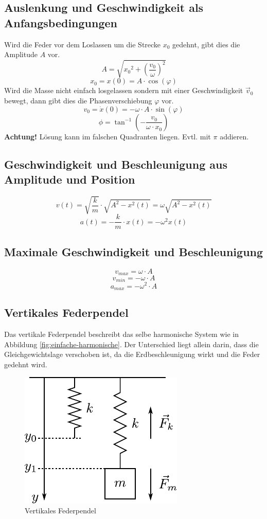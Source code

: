 \subsection{Auslenkung und Geschwindigkeit als Anfangsbedingungen}
Wird die Feder vor dem Loslassen um die Strecke $x_0$ gedehnt, gibt 
dies die Amplitude $A$ vor. 
\[ \boxed{A = \sqrt{{x_0}^2 + \left(\frac{v_0}{\omega}\right)^2}} \]
\[ \boxed{x_0 = x(0) = A \cdot \cos(\varphi)} \]
Wird die Masse nicht einfach losgelassen
sondern mit einer Geschwindigkeit $\vec{v}_0$ bewegt, dann gibt dies
die Phasenverschiebung $\varphi$ vor.
\[ \boxed{v_0 = \dot{x}(0) = - \omega \cdot A \cdot \sin(\varphi)} \]
\[ \boxed{\phi = \tan^{-1}\left(-\frac{v_0}{\omega \cdot x_0}\right)} \]
\textbf{Achtung!} Lösung kann im falschen Quadranten liegen. 
Evtl. mit $\pi$ addieren. 


\subsection{Geschwindigkeit und Beschleunigung aus Amplitude und Position}
\[ \boxed{v(t) = \sqrt{\frac{k}{m}} \cdot \sqrt{A^2 - x^2(t)}
	= \omega \sqrt{A^2 - x^2(t)}} \]
\[ \boxed{a(t) = - \frac{k}{m} \cdot x(t) = - \omega^2 x(t)} \]

\subsection{Maximale Geschwindigkeit und Beschleunigung}
\[ \boxed{v_{max} = \omega \cdot A} \]
\[ \boxed{v_{min} = -\omega \cdot A} \]
\[ \boxed{a_{max} = -\omega^2 \cdot A} \]

\subsection{Vertikales Federpendel}
Das vertikale Federpendel beschreibt das selbe harmonische System wie in
Abbildung \ref{fig:einfache-harmonische}. Der Unterschied liegt allein 
darin, dass die Gleichgewichtslage verschoben ist, da die Erdbeschleunigung 
wirkt und die Feder gedehnt wird.

\begin{figure}[h!]
	\centering
	\includegraphics[scale=0.75]{../fig/federpendel-vertikal.pdf}
	\caption{Vertikales Federpendel}
	\label{fig:federpendel-vertikal}
\end{figure}

